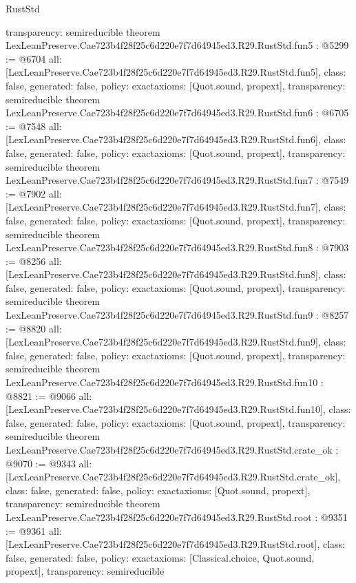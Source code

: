 \begin{lexlean}{RustStd}
\begin{coremodule}
{  transparency: semireducible
}
theorem LexLeanPreserve.Cae723b4f28f25c6d220e7f7d64945ed3.R29.RustStd.fun5 : @5299 := @6704 {
  all: [LexLeanPreserve.Cae723b4f28f25c6d220e7f7d64945ed3.R29.RustStd.fun5],
  class: false,
  generated: false,
  policy: exact{axioms: [Quot.sound, propext]},
  transparency: semireducible
}
theorem LexLeanPreserve.Cae723b4f28f25c6d220e7f7d64945ed3.R29.RustStd.fun6 : @6705 := @7548 {
  all: [LexLeanPreserve.Cae723b4f28f25c6d220e7f7d64945ed3.R29.RustStd.fun6],
  class: false,
  generated: false,
  policy: exact{axioms: [Quot.sound, propext]},
  transparency: semireducible
}
theorem LexLeanPreserve.Cae723b4f28f25c6d220e7f7d64945ed3.R29.RustStd.fun7 : @7549 := @7902 {
  all: [LexLeanPreserve.Cae723b4f28f25c6d220e7f7d64945ed3.R29.RustStd.fun7],
  class: false,
  generated: false,
  policy: exact{axioms: [Quot.sound, propext]},
  transparency: semireducible
}
theorem LexLeanPreserve.Cae723b4f28f25c6d220e7f7d64945ed3.R29.RustStd.fun8 : @7903 := @8256 {
  all: [LexLeanPreserve.Cae723b4f28f25c6d220e7f7d64945ed3.R29.RustStd.fun8],
  class: false,
  generated: false,
  policy: exact{axioms: [Quot.sound, propext]},
  transparency: semireducible
}
theorem LexLeanPreserve.Cae723b4f28f25c6d220e7f7d64945ed3.R29.RustStd.fun9 : @8257 := @8820 {
  all: [LexLeanPreserve.Cae723b4f28f25c6d220e7f7d64945ed3.R29.RustStd.fun9],
  class: false,
  generated: false,
  policy: exact{axioms: [Quot.sound, propext]},
  transparency: semireducible
}
theorem LexLeanPreserve.Cae723b4f28f25c6d220e7f7d64945ed3.R29.RustStd.fun10 : @8821 := @9066 {
  all: [LexLeanPreserve.Cae723b4f28f25c6d220e7f7d64945ed3.R29.RustStd.fun10],
  class: false,
  generated: false,
  policy: exact{axioms: [Quot.sound, propext]},
  transparency: semireducible
}
theorem LexLeanPreserve.Cae723b4f28f25c6d220e7f7d64945ed3.R29.RustStd.crate_ok : @9070 := @9343 {
  all: [LexLeanPreserve.Cae723b4f28f25c6d220e7f7d64945ed3.R29.RustStd.crate_ok],
  class: false,
  generated: false,
  policy: exact{axioms: [Quot.sound, propext]},
  transparency: semireducible
}
theorem LexLeanPreserve.Cae723b4f28f25c6d220e7f7d64945ed3.R29.RustStd.root : @9351 := @9361 {
  all: [LexLeanPreserve.Cae723b4f28f25c6d220e7f7d64945ed3.R29.RustStd.root],
  class: false,
  generated: false,
  policy: exact{axioms: [Classical.choice, Quot.sound, propext]},
  transparency: semireducible
}


\end{coremodule}
\end{lexlean}
